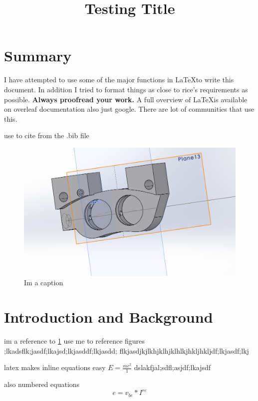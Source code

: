 \documentclass[a4paper,11pt]{YuGroup}
\title{Testing Title}
\begin{document}
\maketitle



\section{Summary}
I have attempted to use some of the major functions in \LaTeX to write this document. In addition I tried to format things as close to rice's requirements as possible. \textbf{Always proofread your work.}  A full overview of \LaTeX is available on overleaf documentation also just google. There are lot of communities that use this. \par
 use \cite{noauthor_phase_nodate} to cite from the .bib file
\begin{figure}[H] %
    \centering
    \includegraphics[scale=.75]{brake caliper.PNG}
    \caption{Im a caption}
    \label{fig:my_label}
\end{figure}
\section{Introduction and Background}

im a reference to \cref{fig:my_label} use me to reference figures ;lkadsflk;jasdf;lkajsd;lkjasddf;lkjasdd;
flkjasdjkjlkhjklhjklhlkjhkljhkljdf;lkjasdf;lkj \par %

latex makes inline equations easy
\begin{math}
    E = \frac{mc^2}{1}
\end{math}
dslakfjal;sdfl;asjdf;lkajsdf \par
also numbered equations
\begin{equation} %
    e = v_{be} * I^{re}
\end{equation}
\end{document}
